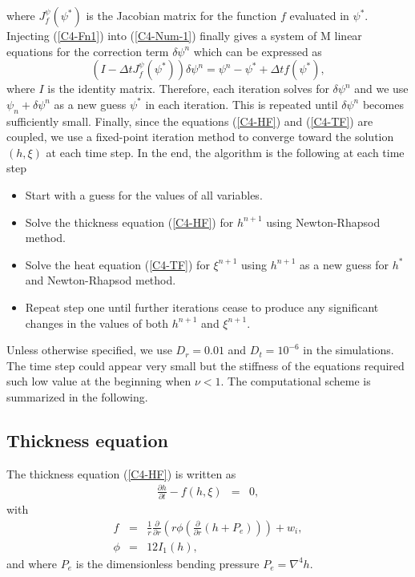 where  $J^\psi_{f}(\psi^*)$ is  the  Jacobian matrix  for  the function  $f$
evaluated  in $\psi^*$.   Injecting (\ref{C4-Fn1})  into (\ref{C4-Num-1})
finally gives a  system of M linear equations for  the correction term
$\delta \psi^n$ which can be expressed as
\begin{equation}
  (I-\Delta tJ^\psi_{f}(\psi^*))\delta \psi^n=\psi^n-\psi^*+\Delta t f(\psi^*),
\end{equation}
where $I$ is the identity matrix. Therefore, each iteration solves for
$\delta \psi^n$ and we use $\psi_n+\delta \psi^n$  as a new guess $\psi^*$ in each
iteration. This  is repeated  until $\delta \psi^n$  becomes sufficiently
small.  Finally,  since the equations (\ref{C4-HF})  and (\ref{C4-TF})
are coupled, we use a  fixed-point iteration method to converge toward
the solution $(h,\xi)$  at each time step.  In the  end, the algorithm
is the following at each time step
\begin{itemize}
\item Start with a guess for the values of all variables.
\item Solve  the thickness equation (\ref{C4-HF})  for $h^{n+1}$ using
  Newton-Rhapsod method.
\item  Solve the  heat  equation (\ref{C4-TF})  for $\xi^{n+1}$  using
  $h^{n+1}$ as a new guess for $h^*$ and Newton-Rhapsod method.
\item Repeat  step one until  further iterations cease to  produce any
  significant changes in the values of both $h^{n+1}$ and $\xi^{n+1}$.
\end{itemize}
Unless otherwise  specified, we use  $D_r= 0.01$ and  $D_t=10^{-6}$ in
the  simulations.  The  time  step  could appear  very  small but  the
stiffness of  the equations required  such low value at  the beginning
when  $\nu  < 1$.   The  computational  scheme  is summarized  in  the
following.

\subsection{Thickness equation}

The thickness equation (\ref{C4-HF}) is written as
\begin{eqnarray}
  \frac{\partial h}{\partial t}-f(h,\xi)&=&0,
\end{eqnarray}
with
\begin{eqnarray}
  f& =& \frac{1}{r}
        \frac{\partial}{\partial      r}
        \left(      r  \phi\left(     \frac{\partial      }{\partial
        r}\left(h+P_e\right)\right)\right)+w_i,\\
  \phi &=& 12I_1(h),
\end{eqnarray}
and where $P_e$ is the dimensionless bending pressure $P_e = \nabla^4h$.

